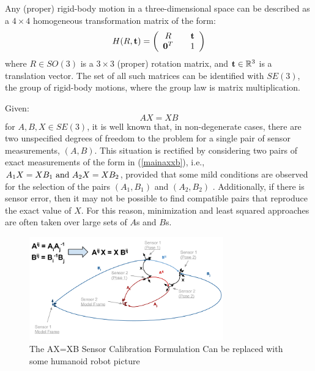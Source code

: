 \documentclass[twocolumn,10pt]{asme2ej}
\begin{document}
\noindent Any (proper) rigid-body motion in a three-dimensional space can be described as a $4\times 4$ homogeneous transformation matrix of the form:
\begin{equation} H(R,{\bf t}) = \left(\begin{array}{ccc}
R && {\bf t} \\
{\bf 0}^T && 1 \end{array} \right)
\label{homotrans} \end{equation}
where $R \in SO(3)$ is a $3\times 3$ (proper) rotation matrix, and ${\bf t} \in \mathbb{R}^3$ is a translation vector. The set of all such matrices
can be identified with $SE(3)$, the group of rigid-body motions, where the group law is matrix multiplication.

Given:
\begin{equation}
A X = X B
\label{mainaxxb}
\end{equation}
for $A,  B, X \in SE(3)$, it is well known that, in non-degenerate cases, there are two unspecified degrees of freedom to the problem for a single pair of sensor measurements, $(A,B)$. This situation is rectified by considering two pairs of exact measurements of the form in (\ref{mainaxxb}), i.e., $ {A_1}X=X{B_1} {\rm \,\, and \,\,} {A_2}X = X{B_2} $, provided that some mild conditions are observed for the selection of the pairs $(A_1,B_1)$ and $(A_2,B_2)$ \cite{chen91,park1994robot,shiu1989calibration}. Additionally, if there is sensor error, then it may not be possible to find compatible pairs that reproduce the exact value of $X$. For this reason, minimization and least squared approaches are often taken over large sets of $A$s and $B$s.


\begin{figure}[t]
\includegraphics[width=3.3in]{figure/AX=XB(ASME)_v1}
\centering
\caption{The AX=XB Sensor Calibration Formulation {\color{red} Can be replaced with some humanoid robot picture}}
\label{AXXBfig}
\end{figure}
\end{document}
